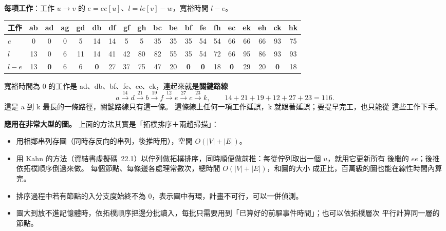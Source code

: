 \begin{pastsoln}
\textbf{每項工作}：工作 $u \to v$ 的 $e = \mathit{ee}[u]$、$l = \mathit{le}[v] - w$，寬裕時間 $l - e$。
\begin{center}
\small
\setlength{\tabcolsep}{4pt}
\begin{tabular}{l*{18}{c}}
\toprule
工作 & ab & ad & ag & gd & db & df & gf & gh & bc & be & bf & fe & fh & ec & ek & eh & ck & hk \\
\midrule
$e$ & 0 & 0 & 0 & 5 & 14 & 14 & 5 & 5 & 35 & 35 & 35 & 54 & 54 & 66 & 66 & 66 & 93 & 75 \\
$l$ & 13 & 0 & 6 & 11 & 14 & 41 & 42 & 80 & 82 & 55 & 35 & 54 & 72 & 66 & 95 & 86 & 93 & 93 \\
$l - e$ & 13 & \textbf{0} & 6 & 6 & \textbf{0} & 27 & 37 & 75 & 47 & 20 & \textbf{0} & \textbf{0} & 18 & \textbf{0} & 29 & 20 & \textbf{0} & 18 \\
\bottomrule
\end{tabular}
\end{center}
寬裕時間為 $0$ 的工作是 ad、db、bf、fe、ec、ck，連起來就是\textbf{關鍵路線}
\[
a \xrightarrow{14} d \xrightarrow{21} b \xrightarrow{19} f \xrightarrow{12} e \xrightarrow{27} c \xrightarrow{23} k,
\qquad 14 + 21 + 19 + 12 + 27 + 23 = 116 .
\]
這是 a 到 k 最長的一條路徑，關鍵路線只有這一條。 這條線上任何一項工作延誤，k 就跟著延誤；要提早完工，也只能從
這些工作下手。

\textbf{應用在非常大型的圖。} 上面的方法其實是「拓樸排序＋兩趟掃描」：
\begin{itemize}
\item 用相鄰串列存圖（同時存反向的串列，後推時用），空間 $O(|V| + |E|)$。
\item 用 Kahn 的方法（資結書虛擬碼~22.1）以佇列做拓樸排序，同時順便做前推：每從佇列取出一個 $u$，就用它更新所有
後繼的 $\mathit{ee}$；後推依拓樸順序倒過來做。 每個節點、每條邊各處理常數次，總時間 $O(|V| + |E|)$，和圖的大小
成正比，百萬級的圖也能在線性時間內算完。
\item 排序過程中若有節點的入分支度始終不為 $0$，表示圖中有環，計畫不可行，可以一併偵測。
\item 圖大到放不進記憶體時，依拓樸順序把邊分批讀入，每批只需要用到「已算好的前驅事件時間」；也可以依拓樸層次
平行計算同一層的節點。
\end{itemize}
\end{pastsoln}

